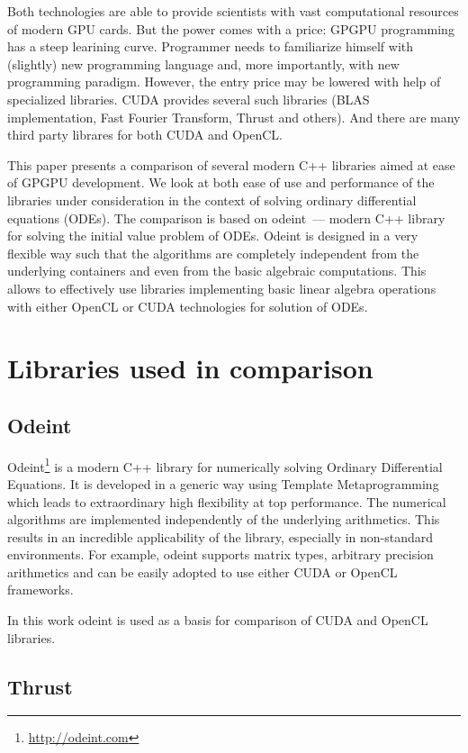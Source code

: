 \documentclass[1p]{elsarticle}
\begin{document}
Both technologies are able to provide scientists with vast computational
resources of modern GPU cards. But the power comes with a price: GPGPU
programming has a steep learining curve. Programmer needs to familiarize
himself with (slightly) new programming language and, more importantly, with
new programming paradigm. However, the entry price may be lowered with help of
specialized libraries. CUDA provides several such libraries (BLAS
implementation, Fast Fourier Transform, Thrust and others). And there are many
third party librares for both CUDA and OpenCL.

This paper presents a comparison of several modern C++ libraries aimed at ease of
GPGPU development. We look at both ease of use and performance of the libraries
under consideration in the context of solving ordinary differential equations (ODEs).
The comparison is based on odeint~--- modern C++ library for solving the initial value problem of ODEs.
Odeint is designed in a very flexible way such that the algorithms are
completely independent from the underlying containers and even from the basic
algebraic computations. This allows to effectively use libraries implementing
basic linear algebra operations with either OpenCL or CUDA technologies for
solution of ODEs.

\section{Libraries used in comparison}

\subsection{Odeint}

Odeint\footnote{\href{http://odeint.com}{http://odeint.com}}
is a modern C++ library for numerically solving Ordinary Differential
Equations. It is developed in a generic way using Template Metaprogramming
which leads to extraordinary high flexibility at top performance. The numerical
algorithms are implemented independently of the underlying arithmetics. This
results in an incredible applicability of the library, especially in
non-standard environments. For example, odeint supports matrix types, arbitrary
precision arithmetics and can be easily adopted to use either CUDA or OpenCL
frameworks.

In this work odeint is used as a basis for comparison of CUDA and OpenCL
libraries.

\subsection{Thrust}
\end{document}
